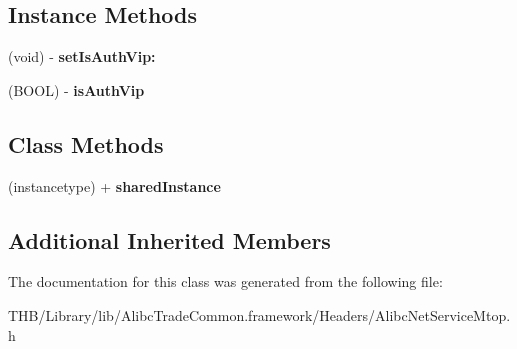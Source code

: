 \subsection*{Instance Methods}
\begin{DoxyCompactItemize}
\item 
\mbox{\label{interface_alibc_net_service_mtop_ab08c9409725598d1ea0451719527fc99}} 
(void) -\/ {\bfseries set\+Is\+Auth\+Vip\+:}
\item 
\mbox{\label{interface_alibc_net_service_mtop_a5a1b666c6d32771aa9ee45ccd4fa2e7a}} 
(B\+O\+OL) -\/ {\bfseries is\+Auth\+Vip}
\end{DoxyCompactItemize}
\subsection*{Class Methods}
\begin{DoxyCompactItemize}
\item 
\mbox{\label{interface_alibc_net_service_mtop_a94f3dfecd2f775804a2cbfaf43a17f7c}} 
(instancetype) + {\bfseries shared\+Instance}
\end{DoxyCompactItemize}
\subsection*{Additional Inherited Members}


The documentation for this class was generated from the following file\+:\begin{DoxyCompactItemize}
\item 
T\+H\+B/\+Library/lib/\+Alibc\+Trade\+Common.\+framework/\+Headers/Alibc\+Net\+Service\+Mtop.\+h\end{DoxyCompactItemize}
